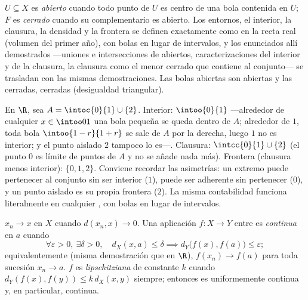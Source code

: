 \begin{definition}\label{def:b2:metric:topology}
$U \subseteq X$ es \emph{abierto}
cuando todo punto de $U$ es centro de una bola contenida en $U$; $F$
es \emph{cerrado} cuando su complementario es abierto. Los entornos,
el interior, la clausura, la densidad y la frontera se definen
exactamente como en la recta real (volumen del primer año), con bolas
en lugar de intervalos, y los enunciados allí demostrados ---uniones e
intersecciones de abiertos, caracterizaciones del interior y de la
clausura, la clausura como el menor cerrado que contiene al
conjunto--- se trasladan con las mismas demostraciones. Las bolas
abiertas son abiertas y las cerradas, cerradas (desigualdad
triangular).
\end{definition}

\begin{example}\label{ex:b2:metric:intclosure}
En $\R$, sea $A = \intoc{0}{1} \cup \{2\}$. Interior:
$\intoo{0}{1}$ ---alrededor de cualquier $x \in \intoo01$ una bola
pequeña se queda dentro de $A$; alrededor de $1$, toda bola
$\intoo{1-r}{1+r}$ se sale de $A$ por la derecha, luego $1$ no es
interior; y el punto aislado $2$ tampoco lo es---. Clausura:
$\intcc{0}{1} \cup \{2\}$ (el punto $0$ es límite de puntos de $A$
y no se añade nada más). Frontera (clausura menos interior): $\{0,
1, 2\}$. Conviene recordar las asimetrías: un extremo puede
pertenecer al conjunto sin ser interior ($1$), puede ser adherente
sin pertenecer ($0$), y un punto aislado es su propia frontera
($2$). La misma contabilidad funciona literalmente en cualquier
, con bolas en lugar de intervalos.
\end{example}

\begin{definition}\label{def:b2:metric:continuity}
$x_n \to x$ en $X$ cuando $d(x_n, x) \to 0$. Una aplicación $f \colon
X \to Y$ entre  es
\emph{continua} en $a$ cuando
\[
\forall \varepsilon > 0,\ \exists\delta > 0,\quad
d_X(x, a) \leq \delta \implies d_Y\bigl(f(x), f(a)\bigr) \leq
\varepsilon ;
\]
equivalentemente (misma demostración que en $\R$), $f(x_n) \to f(a)$
para toda sucesión $x_n \to a$. $f$ es
\emph{lipschitziana} de constante $k$ cuando
$d_Y(f(x), f(y)) \leq k\, d_X(x, y)$ siempre; entonces es
uniformemente continua y, en particular, continua.
\end{definition}

